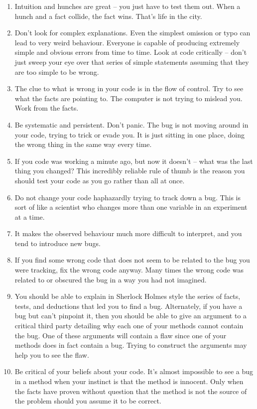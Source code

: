 \documentclass[
]{book}
\providecommand{\tightlist}{%
  \setlength{\itemsep}{0pt}\setlength{\parskip}{0pt}}
\begin{document}
\begin{enumerate}
\def\labelenumi{\arabic{enumi}.}
\tightlist
\item
  Intuition and hunches are great -- you just have to test them out. When a hunch and a fact collide, the fact wins. That's life in the city.
\item
  Don't look for complex explanations. Even the simplest omission or typo can lead to very weird behaviour. Everyone is capable of producing extremely simple and obvious errors from time to time. Look at code critically -- don't just sweep your eye over that series of simple statements assuming that they are too simple to be wrong.
\item
  The clue to what is wrong in your code is in the flow of control. Try to see what the facts are pointing to. The computer is not trying to mislead you. Work from the facts.
\item
  Be systematic and persistent. Don't panic. The bug is not moving around in your code, trying to trick or evade you. It is just sitting in one place, doing the wrong thing in the same way every time.
\item
  If you code was working a minute ago, but now it doesn't -- what was the last thing you changed? This incredibly reliable rule of thumb is the reason you should test your code as you go rather than all at once.
\item
  Do not change your code haphazardly trying to track down a bug. This is sort of like a scientist who changes more than one variable in an experiment at a time.
\item
  It makes the observed behaviour much more difficult to interpret, and you tend to introduce new bugs.
\item
  If you find some wrong code that does not seem to be related to the bug you were tracking, fix the wrong code anyway. Many times the wrong code was related to or obscured the bug in a way you had not imagined.
\item
  You should be able to explain in Sherlock Holmes style the series of facts, tests, and deductions that led you to find a bug. Alternately, if you have a bug but can't pinpoint it, then you should be able to give an argument to a critical third party detailing why each one of your methods cannot contain the bug. One of these arguments will contain a flaw since one of your methods does in fact contain a bug. Trying to construct the arguments may help you to see the flaw.
\item
  Be critical of your beliefs about your code. It's almost impossible to see a bug in a method when your instinct is that the method is innocent. Only when the facts have proven without question that the method is not the source of the problem should you assume it to be correct.

\end{enumerate}
\end{document}
